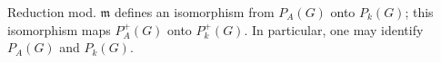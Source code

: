 Reduction mod. $\mathfrak{m}$ defines an isomorphism from $P_A(G)$ onto $P_k(G)$; this isomorphism maps $P_A^+(G)$ onto $P_k^+(G)$. In particular, one may identify $P_A(G)$ and $P_k(G)$.
